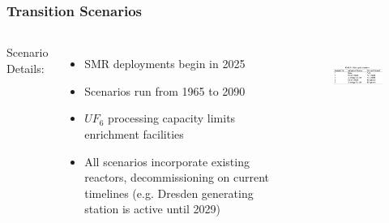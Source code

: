 \begin{frame}
  \frametitle{Transition Scenarios}
  \begin{columns}
    \column[t]{5cm}
    Scenario Details:
      \begin{itemize}
              \item SMR deployments begin in 2025
              \item Scenarios run from 1965 to 2090
              \item $UF_6$ processing capacity limits enrichment facilities
              \item All scenarios incorporate existing reactors, decommissioning on current timelines (e.g. Dresden generating station is active until 2029)
      \end{itemize}
    \column[t]{5cm}
  \begin{figure}[htbp!]
    \begin{center}
      \includegraphics[height=2cm]{./images/scenarios.png}
    \end{center}
          \caption{}
    \label{fig:scenarios}
  \end{figure}
\end{columns}
\end{frame}
